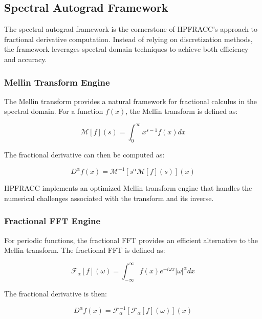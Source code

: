 \documentclass[12pt]{article}
\begin{document}
\subsection{Spectral Autograd Framework}

The spectral autograd framework is the cornerstone of HPFRACC's approach to fractional derivative computation. Instead of relying on discretization methods, the framework leverages spectral domain techniques to achieve both efficiency and accuracy.

\subsubsection{Mellin Transform Engine}

The Mellin transform provides a natural framework for fractional calculus in the spectral domain. For a function $f(x)$, the Mellin transform is defined as:

\begin{equation}
\mathcal{M}[f](s) = \int_0^{\infty} x^{s-1} f(x) dx
\end{equation}

The fractional derivative can then be computed as:

\begin{equation}
D^{\alpha}f(x) = \mathcal{M}^{-1}[s^{\alpha} \mathcal{M}[f](s)](x)
\end{equation}

HPFRACC implements an optimized Mellin transform engine that handles the numerical challenges associated with the transform and its inverse.

\subsubsection{Fractional FFT Engine}

For periodic functions, the fractional FFT provides an efficient alternative to the Mellin transform. The fractional FFT is defined as:

\begin{equation}
\mathcal{F}_{\alpha}[f](\omega) = \int_{-\infty}^{\infty} f(x) e^{-i\omega x} |\omega|^{\alpha} dx
\end{equation}

The fractional derivative is then:

\begin{equation}
D^{\alpha}f(x) = \mathcal{F}_{\alpha}^{-1}[\mathcal{F}_{\alpha}[f](\omega)](x)
\end{equation}
\end{document}
